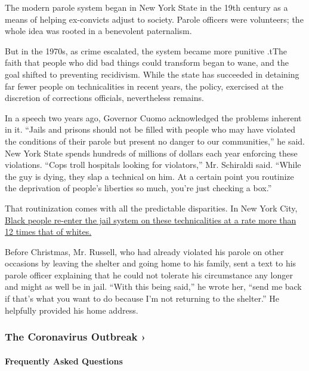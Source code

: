 The modern parole system began in New York State in the 19th century as
a means of helping ex-convicts adjust to society. Parole officers were
volunteers; the whole idea was rooted in a benevolent paternalism.

But in the 1970s, as crime escalated, the system became more punitive
.tThe faith that people who did bad things could transform began to
wane, and the goal shifted to preventing recidivism. While the state has
succeeded in detaining far fewer people on technicalities in recent
years, the policy, exercised at the discretion of corrections officials,
nevertheless remains.

In a speech two years ago, Governor Cuomo acknowledged the problems
inherent in it. ``Jails and prisons should not be filled with people who
may have violated the conditions of their parole but present no danger
to our communities,'' he said. New York State spends hundreds of
millions of dollars each year enforcing these violations. ``Cops troll
hospitals looking for violators,'' Mr. Schiraldi said. ``While the guy
is dying, they slap a technical on him. At a certain point you routinize
the deprivation of people's liberties so much, you're just checking a
box.''

That routinization comes with all the predictable disparities. In New
York City, \href{https://www.katalcenter.org/lessismoreny}{Black people
re-enter the jail system on these technicalities at a rate more than 12
times that of whites.}

Before Christmas, Mr. Russell, who had already violated his parole on
other occasions by leaving the shelter and going home to his family,
sent a text to his parole officer explaining that he could not tolerate
his circumstance any longer and might as well be in jail. ``With this
being said,'' he wrote her, ``send me back if that's what you want to do
because I'm not returning to the shelter.'' He helpfully provided his
home address.

\href{https://www.nytimes.com/news-event/coronavirus?action=click\&pgtype=Article\&state=default\&region=MAIN_CONTENT_3\&context=storylines_faq}{}

\hypertarget{the-coronavirus-outbreak-}{%
\subsubsection{The Coronavirus Outbreak
›}\label{the-coronavirus-outbreak-}}

\hypertarget{frequently-asked-questions}{%
\paragraph{Frequently Asked
Questions}\label{frequently-asked-questions}}

